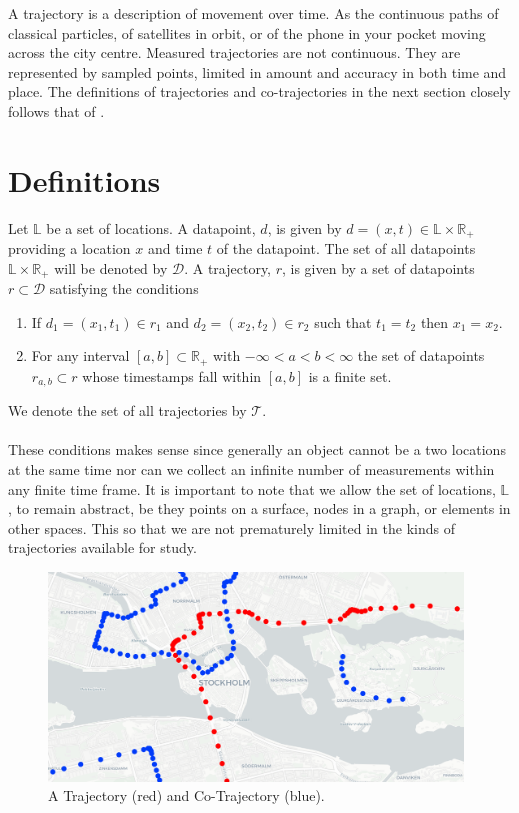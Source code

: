 \documentclass[../main.tex]{subfiles}
\begin{document}
A trajectory is a description of movement over time. 
As the continuous paths of classical particles,
of satellites in orbit, or of the phone in your pocket
moving across the city centre. Measured trajectories are
not continuous. They are represented by sampled points,
limited in amount and accuracy in both time and place.
The definitions of trajectories and co-trajectories in
the next section closely follows that of \cite{dahne2019privacy}.

\section{Definitions}
Let $\mathbb{L}$ be a set of locations. 
A datapoint, $d$, is given by $d = (x,t)
\in\mathbb{L}\times\mathbb{R}_+$ 
providing a location $x$ and time $t$ of the datapoint.
The set of all datapoints $\mathbb{L}\times\mathbb{R}_+$
will be denoted by $\mathcal{D}$. A trajectory, $r$,
is given by a set of datapoints $r \subset \mathcal{D}$
satisfying the conditions

\begin{enumerate}
    \item If $d_1 = (x_1,t_1) \in r_1$ and $d_2 = (x_2,t_2) \in r_2$ such that $t_1 = t_2$ then $x_1 = x_2$.
    \item For any interval $[a,b] \subset \mathbb{R}_+$ with $-\infty<a<b<\infty$
    the set of datapoints $r_{a,b}\subset r$ whose timestamps fall within $[a,b]$ is a finite set.
\end{enumerate}
We denote the set of all trajectories by $\mathcal{T}$.
\\\\
These conditions makes sense since generally an object cannot be a two locations at the same time nor can we collect an infinite number of measurements within any finite time frame. It is important to note that we allow the set of locations, $\mathbb{L}$, to remain abstract, be they
points on a surface, nodes in a graph, or elements in other spaces. This
so that we are not prematurely limited in the kinds of trajectories available for study.

\begin{figure}[ht]
\centering
\begin{adjustbox}{center}
\includegraphics[width=0.98\textwidth]{graphics/non-results/trajectory.png}
\end{adjustbox}
\caption{A Trajectory (red) and Co-Trajectory (blue).}
\end{figure}
\end{document}
